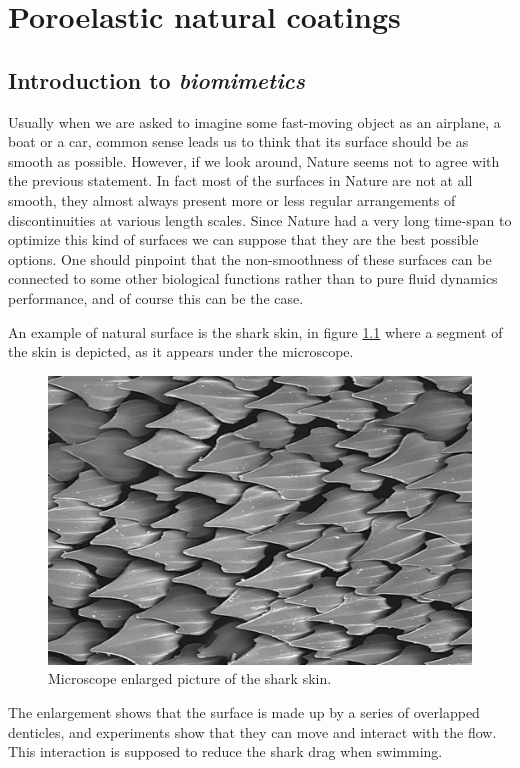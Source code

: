 \chapter{Poroelastic natural coatings}



\section{Introduction to \textit{biomimetics}}

Usually when we are asked to imagine some fast-moving object as an airplane, a boat or a car, common sense leads us to think that its surface should be as smooth as possible.
However, if we look around, Nature seems not to agree with the previous statement.
In fact most of the surfaces in Nature are not at all smooth, they almost always present more or less regular arrangements of discontinuities at various length scales.
Since Nature had a very long time-span to optimize this kind of surfaces we can suppose that they are the best possible options.
One should pinpoint that the non-smoothness of these surfaces can be connected to some other biological functions rather than to pure fluid dynamics performance, and of course this can be the case.

An example of natural surface is the shark skin, in figure \ref{fig:shark} where a segment of the skin is depicted, as it appears under the microscope.

\begin{figure}[h]
	\centering
	\includegraphics[width=0.6\linewidth]{chapter_1/shark}
	\caption{Microscope enlarged picture of the shark skin.}
	\label{fig:shark}
\end{figure}

The enlargement shows that the surface is made up by a series of overlapped denticles, and experiments show that they can move and interact with the flow. This interaction is supposed to reduce the shark drag when swimming.

